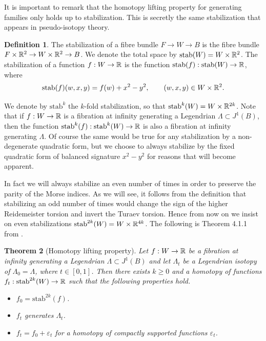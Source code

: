 \documentclass[11pt]{article}
\numberwithin{equation}{section}\providecommand{\dpl}{\displaystyle}
\newcommand{\stab}{\mathrm{stab}}
\theoremstyle{plain}
\newtheorem{theorem}{Theorem}[section]
\theoremstyle{definition}
\newtheorem{definition}[theorem]{Definition}
\begin{document}
It is important to remark that the homotopy lifting property for generating families only holds up to stabilization. This is secretly the same stabilization that appears in pseudo-isotopy theory.
\begin{definition}
The stabilization of a fibre bundle $F \to W \to B$ is the fibre bundle $F \times \mathbb{R}^2 \to W \times \mathbb{R}^2 \to B$. We denote the total space by $\stab (W)=W \times \bR^2$. The stabilization of a function $f:W \to \mathbb{R}$ is the function $\stab (f): \stab (W) \to \bR$, where
\[ \stab (f)(w,x,y)=f(w)+x^2-y^2, \quad \quad (w,x,y) \in W \times \bR^2. \]
\end{definition}

We denote by $\stab ^k$ the $k$-fold stabilization, so that $\stab ^{k}(W)=W \times \bR^{2k}$. Note that if $f:W \to \mathbb{R}$ is a fibration at infinity generating a Legendrian $\Lambda \subset J^1(B)$, then the function $\stab ^{k}(f): \stab ^{k}(W) \to \bR$ is also a fibration at infinity generating $\Lambda$. Of course the same would be true for any stabilization by a non-degenerate quadratic form, but we choose to always stabilize by the fixed quadratic form of balanced signature $x^2-y^2$ for reasons that will become apparent.

In fact we will always stabilize an even number of times in order to preserve the parity of the Morse indices. As we will see, it follows from the definition that stabilizing an odd number of times would change the sign of the higher Reidemeister torsion and invert the Turaev torsion. Hence from now on we insist on even stabilizations $\stab ^{2k}(W)=W \times \bR^{4k}$. The following is Theorem 4.1.1 from \cite{EG98}.

\begin{theorem}[Homotopy lifting property]\label{Persistence Theorem}
Let $f:W \to \mathbb{R}$ be a fibration at infinity generating a Legendrian $\Lambda \subset J^1(B)$ and let $ \Lambda_t $ be a Legendrian isotopy of $\Lambda_0=\Lambda$, where $t \in [0,1]$. Then there exists $k\geq0$ and a homotopy of functions $f_t: \stab ^{2k}(W) \to \bR$ such that the following properties hold.
\begin{itemize}
\item $f_0=\stab ^{2k}(f)$.
\item $f_t$ generates $\Lambda_t$.
\item $f_t=f_0+ \varepsilon_t$ for a homotopy of compactly supported functions $\varepsilon_t$.
\end{itemize}
\end{theorem}
\end{document}
